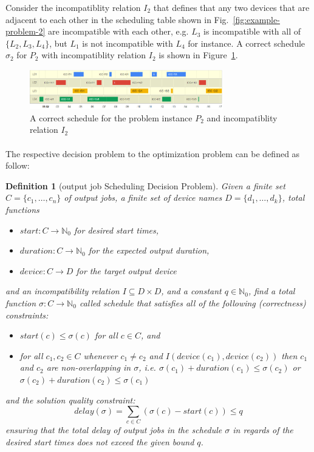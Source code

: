 \documentclass{article}
\newtheorem{mydef}{Definition}
\newcommand{\Nats}{\ensuremath{\mathbb{N}}}
\begin{document}
Consider the incompatiblity relation $I_2$ that defines that any two devices that are adjacent to each other in the scheduling table shown in Fig.~\ref{fig:example-problem-2} are incompatible with each other, e.g. $L_3$ is incompatible with all of $\{L_2,L_3,L_4\}$, but $L_1$ is not incompatible with $L_4$ for instance.   A correct schedule $\sigma_2$ for $P_2$ with incompatiblity relation $I_2$ is shown in Figure~\ref{fig:example-solution-2}.

\begin{figure}[h]
  \centering
    \includegraphics[width=0.75\textwidth]{figures/example-solution-adjacent-or-self-incompatibility.png}
\caption{A correct schedule for the problem instance $P_2$ and incompatiblity relation $I_2$}
\label{fig:example-solution-2}
\end{figure}



\paragraph{}
The respective decision problem to the optimization problem can be defined as follow: 

\begin{mydef}[{\sc output job Scheduling} Decision Problem]
\label{def:ic-scheduling-dp}
Given a finite  set ${C} = \{c_1, \ldots, c_n\}$ of output jobs, a finite set of  device names $D = \{d_1, \ldots, d_k\}$, total functions 
\begin{itemize}
\item[-]  ${start} : C \rightarrow \Nats_0$ for desired start times,
\item[-]   ${duration} : C \rightarrow \Nats_0$ for the expected output duration,  
\item[-]   ${device} : C \rightarrow D$ for the target output device
\end{itemize}
and an incompatibility relation $I \subseteq D \times D $, and a constant $q \in \Nats_0$, 
find a total function $\sigma: C \rightarrow \Nats_0$  called {\em schedule} that satisfies all of the following (correctness) constraints:
\begin{itemize}
\item[-]   ${start}(c) \leq \sigma(c)$ for all $c \in  C$, and
\item[-]  for all $c_1, c_2 \in C$ whenever $c_1 \not= c_2$ and $I({device}(c_1),{device}(c_2))$ then  $c_1$ and $c_2$ are non-overlapping in $\sigma$, i.e. $\sigma(c_1) + {duration}(c_1) \leq \sigma(c_2)$ or $\sigma(c_2) + {duration}(c_2) \leq \sigma(c_1)$
\end{itemize}
and the solution quality constraint:
\[{delay}(\sigma) = \sum_{c \in C} (\sigma(c) - {start}(c)) \leq q \]
ensuring that the total delay of output jobs in the schedule $\sigma$ in regards of the desired start times does not exceed the given bound $q$.

\end{mydef}
\end{document}
